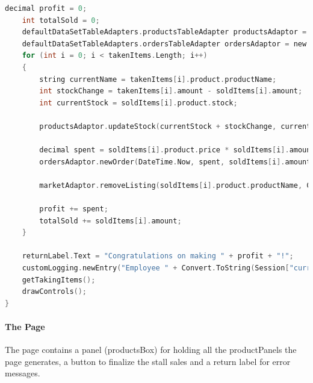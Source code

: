 ﻿\documentclass{article}
\begin{document}
\begin{lstlisting}[language=C]
    decimal profit = 0;
    int totalSold = 0;
    defaultDataSetTableAdapters.productsTableAdapter productsAdaptor = new defaultDataSetTableAdapters.productsTableAdapter();
    defaultDataSetTableAdapters.ordersTableAdapter ordersAdaptor = new defaultDataSetTableAdapters.ordersTableAdapter();
    for (int i = 0; i < takenItems.Length; i++)
    {
        string currentName = takenItems[i].product.productName;
        int stockChange = takenItems[i].amount - soldItems[i].amount;
        int currentStock = soldItems[i].product.stock;
        
        productsAdaptor.updateStock(currentStock + stockChange, currentName);

        decimal spent = soldItems[i].product.price * soldItems[i].amount;
        ordersAdaptor.newOrder(DateTime.Now, spent, soldItems[i].amount, "Market", soldItems[i].product.productName);

        marketAdaptor.removeListing(soldItems[i].product.productName, Convert.ToString(Session["currentUser"]));

        profit += spent;
        totalSold += soldItems[i].amount;
    }

    returnLabel.Text = "Congratulations on making " + profit + "!";
    customLogging.newEntry("Employee " + Convert.ToString(Session["currentUser"] + " sold " + totalSold + " products."));
    getTakingItems();
    drawControls();
}
    \end{lstlisting}
    \paragraph{The Page}
    The page contains a panel (productsBox) for holding all the productPanels the page generates, a button to finalize the stall sales and a return label for error messages.
\end{document}
